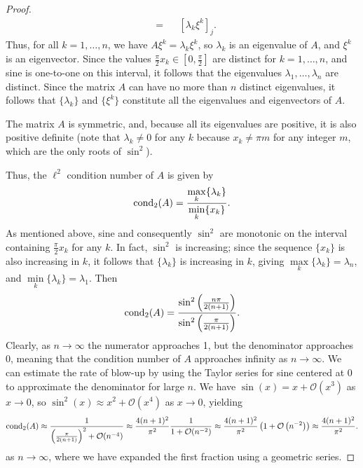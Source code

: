\documentclass{homework}
\begin{document}
\begin{proof}
\begin{equation*}
\begin{alignedat}{2}
			&={} && \left[\lambda_k\xi^k\right]_j.
		\end{alignedat}
		\end{equation*}
		Thus, for all $k=1,\dots, n$, we have $A\xi^k = \lambda_k\xi^k$, so $\lambda_k$ is an eigenvalue of $A$, and $\xi^k$ is an eigenvector. Since the values $\frac{\pi}{2}x_k \in \left[0, \frac{\pi}{2}\right]$ are distinct for $k=1,\dots, n$, and sine is one-to-one on this interval, it follows that the eigenvalues $\lambda_1, \dots, \lambda_n$ are distinct. Since the matrix $A$ can have no more than $n$ distinct eigenvalues, it follows that $\{\lambda_k\}$ and $\{\xi^k\}$ constitute all the eigenvalues and eigenvectors of $A$.
		
		The matrix $A$ is symmetric, and, because all its eigenvalues are positive, it is also positive definite (note that $\lambda_k \ne 0$ for any $k$ because $x_k \ne \pi m$ for any integer $m$, which are the only roots of $\sin^2$).
		
		Thus, the $\ell^2$ condition number of $A$ is given by
		\begin{equation*}
			\operatorname{cond}_2(A) = \frac{\max\limits_k \{\lambda_k\}}{\min\limits_k\{x_k\}}.
		\end{equation*}
		As mentioned above, sine and consequently $\sin^2$ are monotonic on the interval containing $\frac{\pi}{2}x_k$ for any $k$. In fact, $\sin^2$ is increasing; since the sequence $\{x_k\}$ is also increasing in $k$, it follows that $\{\lambda_k\}$ is increasing in $k$, giving $\max\limits_k\{\lambda_k\} = \lambda_n$, and $\min\limits_k\{\lambda_k\} = \lambda_1$. Then
		\begin{equation*}
			\operatorname{cond}_2(A) = \frac{\sin^2\left(\frac{n\pi}{2(n+1)}\right)}{\sin^2\left(\frac{\pi}{2(n+1)}\right)}.
		\end{equation*}
		Clearly, as $n\to\infty$ the numerator approaches 1, but the denominator approaches 0, meaning that the condition number of $A$ approaches infinity as $n \to \infty$. We can estimate the rate of blow-up by using the Taylor series for sine centered at 0 to approximate the denominator for large $n$. We have $\sin(x) = x + \mathcal{O}(x^3)$ as $x \to 0$, so $\sin^2(x) \approx x^2 + \mathcal{O}(x^4)$ as $x \to 0$, yielding
		\begin{equation*}
			\operatorname{cond}_2(A) \approx \frac{1}{\left(\frac{\pi}{2(n+1)}\right)^2 + \mathcal{O}(n^{-4})} \approx \frac{4(n+1)^2}{\pi^2}\frac{1}{1 + \mathcal{O}(n^{-2})} \approx \frac{4(n+1)^2}{\pi^2}\left(1 + \mathcal{O}\left(n^{-2}\right)\right) \approx \frac{4(n+1)^2}{\pi^2}.
		\end{equation*}
		as $n\to\infty$, where we have expanded the first fraction using a geometric series.
	\end{proof}
	
\end{document}
